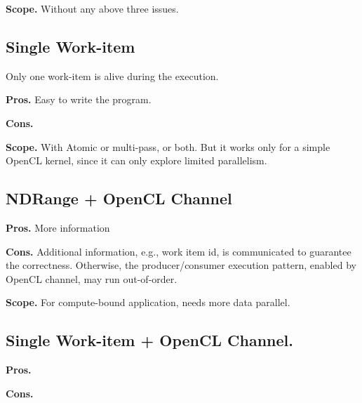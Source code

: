 {\bf Scope. }Without any above three issues. 


\subsection{Single Work-item} Only one work-item is alive during the execution. 

{\bf Pros. }Easy to write the program. 

{\bf Cons. }


{\bf Scope. }With Atomic or multi-pass, or both. But it works only for a simple OpenCL kernel, since it can only explore limited parallelism.


\subsection{NDRange + OpenCL Channel}

{\bf Pros. }More information

{\bf Cons. }Additional information, e.g., work item id, is communicated to guarantee the correctness. Otherwise, the producer/consumer execution pattern, enabled by OpenCL channel, may run out-of-order.

{\bf Scope. }For compute-bound application, needs more data parallel.


\subsection{Single Work-item + OpenCL Channel. }

{\bf Pros. }

{\bf Cons. }


